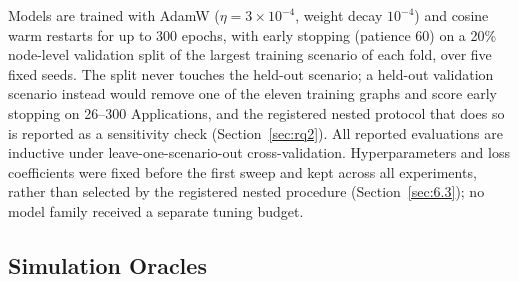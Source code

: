 Models are trained with AdamW ($\eta = 3 \times 10^{-4}$, weight decay $10^{-4}$) and cosine warm restarts for up to 300 epochs, with early stopping (patience 60) on a 20\% node-level validation split of the largest training scenario of each fold, over five fixed seeds. The split never touches the held-out scenario; a held-out validation scenario instead would remove one of the eleven training graphs and score early stopping on 26--300 Applications, and the registered nested protocol that does so is reported as a sensitivity check (Section~\ref{sec:rq2}). All reported evaluations are inductive under leave-one-scenario-out cross-validation. Hyperparameters and loss coefficients were fixed before the first sweep and kept across all experiments, rather than selected by the registered nested procedure (Section~\ref{sec:6.3}); no model family received a separate tuning budget.

\subsection{Simulation Oracles}
\label{sec:4.3}

